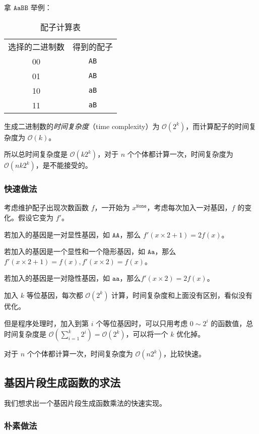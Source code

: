 \documentclass{article}
\begin{document}
拿 $\texttt{AaBB}$ 举例：

\begin{table}[htbp]
	\centering
	\caption{配子计算表}
	\begin{tabular}{|c|c|}
		选择的二进制数 & 得到的配子 \\
		00 & \texttt{AB} \\
		01 & \texttt{AB} \\
		10 & \texttt{aB} \\
		11 & \texttt{aB} \\
	\end{tabular}
\end{table}

生成二进制数的\textsl{时间复杂度}（time complexity）为 $\mathcal O(2^k)$，而计算配子的时间复杂度为 $\mathcal O(k)$。

所以总时间复杂度是 $\mathcal O(k 2^k)$，对于 $n$ 个个体都计算一次，时间复杂度为 $\mathcal O(nk 2^k)$，是不能接受的。

\subsubsection*{快速做法}

考虑维护配子出现次数函数 $f$，一开始为 $x^{\texttt{None}}$，考虑每次加入一对基因，$f$ 的变化。假设它变为 $f'$。

若加入的基因是一对显性基因，如 $\texttt{AA}$，那么 $f'(x \times 2 + 1)=2f(x)$。

若加入的基因是一个显性和一个隐形基因，如 $\texttt{Aa}$，那么 $f'(x \times 2 + 1)=f(x),f'(x \times 2)=f(x)$。

若加入的基因是一对隐性基因，如 $\texttt{aa}$，那么$f'(x \times 2)=2f(x)$。

加入 $k$ 等位基因，每次都 $\mathcal O(2^k)$ 计算，时间复杂度和上面没有区别，看似没有优化。

但是程序处理时，加入到第 $i$ 个等位基因时，可以只用考虑 $0 \sim 2^i$ 的函数值，总时间复杂度是 $\mathcal O(\sum_{i=1}^k 2^i)=\mathcal O(2^k)$，可以将一个 $k$ 优化掉。

对于 $n$ 个个体都计算一次，时间复杂度为 $\mathcal O(n2^k)$，比较快速。

\subsection{基因片段生成函数的求法}

我们想求出一个基因片段生成函数乘法的快速实现。

\subsubsection*{朴素做法}
\end{document}
